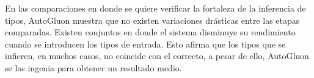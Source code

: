 En las comparaciones en donde se quiere verificar la fortaleza de la inferencia de tipos, AutoGluon muestra que no existen variaciones drásticas entre las etapas 
comparadas. Existen conjuntos en donde el sistema disminuye su rendimiento cuando se introducen los tipos de entrada. Esto afirma que los tipos que se infieren, 
en muchos casos, no coincide con el correcto, a pesar de ello, AutoGluon se las ingenia para obtener un resultado medio.


